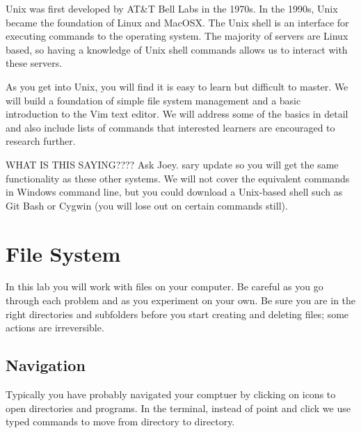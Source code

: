 \label{lab:Shell}


Unix was first developed by AT\&T Bell Labs in the 1970s. In the 1990s, Unix became the foundation of Linux and MacOSX. 
The Unix shell is an interface for executing commands to the operating system.
The majority of servers are Linux based, so having a knowledge of Unix shell commands allows us to interact with these servers. 

As you get into Unix, you will find it is easy to learn but difficult to master.
We will build a foundation of simple file system management and a basic introduction to the Vim text editor.  
We will address some of the basics in detail and also include lists of commands that interested learners are encouraged to research further.

\begin{info} 
WHAT IS THIS SAYING????  Ask Joey.
sary update so you will get the same functionality as these other systems.
We will not cover the equivalent commands in Windows command line, but you could download a Unix-based shell such as Git Bash or Cygwin (you will lose out on certain commands still).
\end{info}

\section*{File System}

\begin{warn}
In this lab you will work with files on your computer. Be careful as you go through each problem and as you experiment on your own.
Be sure you are in the right directories and subfolders before you start creating and deleting files; some actions are irreversible.
\end{warn}

\subsection*{Navigation}

Typically you have probably navigated your comptuer by clicking on icons to open directories and programs.
In the terminal, instead of point and click we use typed commands to move from directory to directory.

